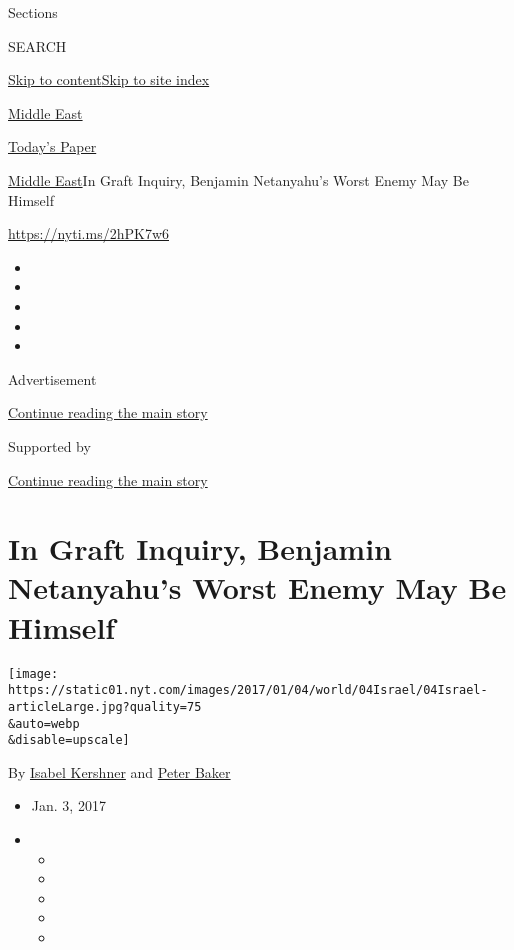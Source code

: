 Sections

SEARCH

\protect\hyperlink{site-content}{Skip to
content}\protect\hyperlink{site-index}{Skip to site index}

\href{https://www.nytimes.com/section/world/middleeast}{Middle East}

\href{https://myaccount.nytimes.com/auth/login?response_type=cookie\&client_id=vi}{}

\href{https://www.nytimes.com/section/todayspaper}{Today's Paper}

\href{/section/world/middleeast}{Middle East}\textbar{}In Graft Inquiry,
Benjamin Netanyahu's Worst Enemy May Be Himself

\url{https://nyti.ms/2hPK7w6}

\begin{itemize}
\item
\item
\item
\item
\item
\end{itemize}

Advertisement

\protect\hyperlink{after-top}{Continue reading the main story}

Supported by

\protect\hyperlink{after-sponsor}{Continue reading the main story}

\hypertarget{in-graft-inquiry-benjamin-netanyahus-worst-enemy-may-be-himself}{%
\section{In Graft Inquiry, Benjamin Netanyahu's Worst Enemy May Be
Himself}\label{in-graft-inquiry-benjamin-netanyahus-worst-enemy-may-be-himself}}

\texttt{[image: https://static01.nyt.com/images/2017/01/04/world/04Israel/04Israel-articleLarge.jpg?quality=75\\\&auto=webp\\\&disable=upscale]}

By \href{https://www.nytimes.com/by/isabel-kershner}{Isabel Kershner}
and \href{http://www.nytimes.com/by/peter-baker}{Peter Baker}

\begin{itemize}
\item
  Jan. 3, 2017
\item
  \begin{itemize}
  \item
  \item
  \item
  \item
  \item
  \end{itemize}
\end{itemize}

